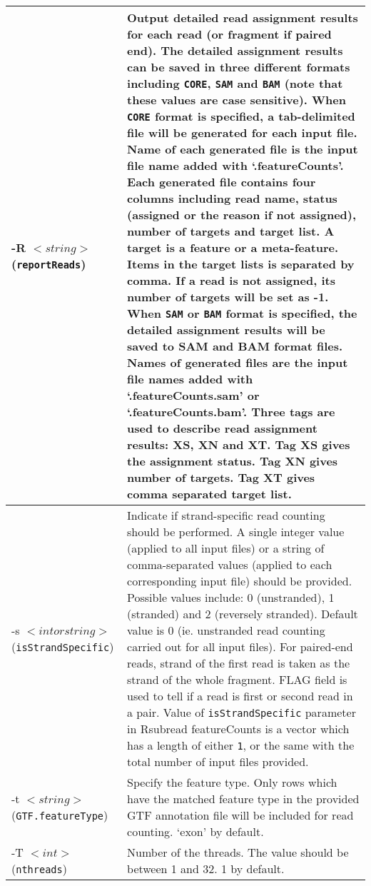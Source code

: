 \documentclass[12pt]{report}
\newcommand{\code}[1]{{\small\texttt{#1}}}
\newcommand{\Rsubread}{\textsf{Rsubread}}
\newcommand{\featureCounts}{\textsf{featureCounts}}
\begin{document}
\begin{longtable}{|p{5cm}|p{11cm}|}
\hline
-R $<string>$ \newline (\code{reportReads}) & Output detailed read assignment results for each read (or fragment if paired end). The detailed assignment results can be saved in three different formats including \code{CORE}, \code{SAM} and \code{BAM} (note that these values are case sensitive). \newline When \code{CORE} format is specified, a tab-delimited file will be generated for each input file. Name of each generated file is the input file name added with `.featureCounts'.  Each generated file contains four columns including read name, status (assigned or the reason if not assigned), number of targets and target list. A target is a feature or a meta-feature. Items in the target lists is separated by comma. If a read is not assigned, its number of targets will be set as -1. \newline When \code{SAM} or \code{BAM} format is specified, the detailed assignment results will be saved to SAM and BAM format files. Names of generated files are the input file names added with `.featureCounts.sam' or `.featureCounts.bam'. Three tags are used to describe read assignment results: XS, XN and XT. Tag XS gives the assignment status. Tag XN gives number of targets. Tag XT gives comma separated target list. \\
\hline
-s $<int or string>$ \newline (\code{isStrandSpecific}) & Indicate if strand-specific read counting should be performed. A single integer value (applied to all input files) or a string of comma-separated values (applied to each corresponding input file) should be provided. Possible values include: 0 (unstranded), 1 (stranded) and 2 (reversely stranded). Default value is 0 (ie. unstranded read counting carried out for all input files). For paired-end reads, strand of the first read is taken as the strand of the whole fragment. FLAG field is used to tell if a read is first or second read in a pair. Value of \code{isStrandSpecific} parameter in {\Rsubread} {\featureCounts} is a vector which has a length of either {\code{1}}, or the same with the total number of input files provided. \\
\hline
-t $<string>$ \newline (\code{GTF.featureType}) & Specify the feature type. Only rows which have the matched feature type in the provided GTF annotation file will be included for read counting. `exon' by default.\\
\hline
-T $<int>$ \newline (\code{nthreads}) & Number of the threads. The value should be between 1 and 32. 1 by default.\\

\end{longtable}
\end{document}
